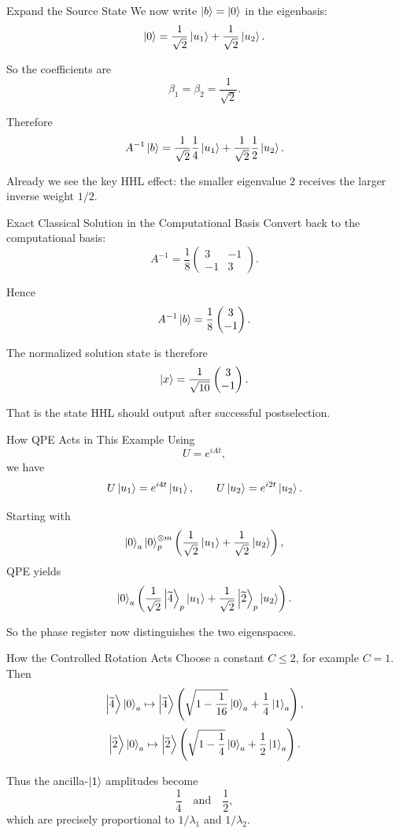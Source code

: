 \documentclass{beamer}
\begin{document}
\begin{frame}{Expand the Source State}
We now write \(\ket{b}=\ket{0}\) in the eigenbasis:
\[
\ket{0}
=
\frac{1}{\sqrt{2}}\ket{u_1}
+
\frac{1}{\sqrt{2}}\ket{u_2}.
\]

So the coefficients are
\[
\beta_1=\beta_2=\frac{1}{\sqrt{2}}.
\]

Therefore
\[
A^{-1}\ket{b}
=
\frac{1}{\sqrt{2}}\frac{1}{4}\ket{u_1}
+
\frac{1}{\sqrt{2}}\frac{1}{2}\ket{u_2}.
\]

Already we see the key HHL effect: the smaller eigenvalue \(2\) receives the larger inverse weight \(1/2\).
\end{frame}

\begin{frame}{Exact Classical Solution in the Computational Basis}
Convert back to the computational basis:
\[
A^{-1}
=
\frac{1}{8}
\begin{pmatrix}
3 & -1\\
-1 & 3
\end{pmatrix}.
\]

Hence
\[
A^{-1}\ket{b}
=
\frac{1}{8}
\begin{pmatrix}
3\\
-1
\end{pmatrix}.
\]

The normalized solution state is therefore
\[
\ket{x}
=
\frac{1}{\sqrt{10}}
\begin{pmatrix}
3\\
-1
\end{pmatrix}.
\]

That is the state HHL should output after successful postselection.
\end{frame}

\begin{frame}{How QPE Acts in This Example}
Using
\[
U=e^{iAt},
\]
we have
\[
U\ket{u_1}=e^{i4t}\ket{u_1},
\qquad
U\ket{u_2}=e^{i2t}\ket{u_2}.
\]

Starting with
\[
\ket{0}_a\ket{0}^{\otimes m}_p
\left(
\frac{1}{\sqrt{2}}\ket{u_1}
+
\frac{1}{\sqrt{2}}\ket{u_2}
\right),
\]
QPE yields
\[
\ket{0}_a
\left(
\frac{1}{\sqrt{2}}\ket{\widetilde{4}}_p\ket{u_1}
+
\frac{1}{\sqrt{2}}\ket{\widetilde{2}}_p\ket{u_2}
\right).
\]

So the phase register now distinguishes the two eigenspaces.
\end{frame}

\begin{frame}{How the Controlled Rotation Acts}
Choose a constant \(C\le 2\), for example \(C=1\). Then
\[
\ket{\widetilde{4}}\ket{0}_a
\mapsto
\ket{\widetilde{4}}
\left(
\sqrt{1-\frac{1}{16}}\ket{0}_a+\frac{1}{4}\ket{1}_a
\right),
\]
\[
\ket{\widetilde{2}}\ket{0}_a
\mapsto
\ket{\widetilde{2}}
\left(
\sqrt{1-\frac{1}{4}}\ket{0}_a+\frac{1}{2}\ket{1}_a
\right).
\]

Thus the ancilla-\(\ket{1}\) amplitudes become
\[
\frac{1}{4}
\quad \text{and} \quad
\frac{1}{2},
\]
which are precisely proportional to \(1/\lambda_1\) and \(1/\lambda_2\).
\end{frame}
\end{document}
